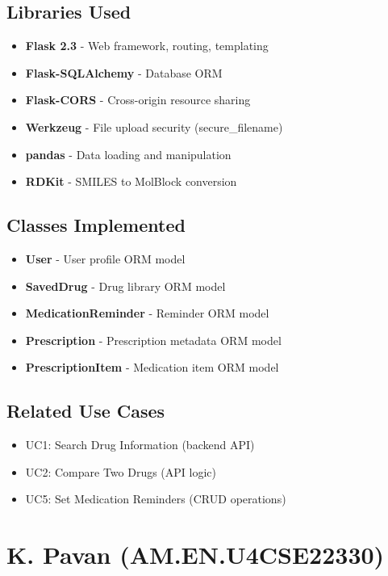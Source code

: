 \documentclass[12pt,a4paper]{report}
\begin{document}
\section{Libraries Used}
\begin{itemize}
    \item \textbf{Flask 2.3} - Web framework, routing, templating
    \item \textbf{Flask-SQLAlchemy} - Database ORM
    \item \textbf{Flask-CORS} - Cross-origin resource sharing
    \item \textbf{Werkzeug} - File upload security (secure\_filename)
    \item \textbf{pandas} - Data loading and manipulation
    \item \textbf{RDKit} - SMILES to MolBlock conversion
\end{itemize}

\section{Classes Implemented}
\begin{itemize}
    \item \textbf{User} - User profile ORM model
    \item \textbf{SavedDrug} - Drug library ORM model
    \item \textbf{MedicationReminder} - Reminder ORM model
    \item \textbf{Prescription} - Prescription metadata ORM model
    \item \textbf{PrescriptionItem} - Medication item ORM model
\end{itemize}

\section{Related Use Cases}
\begin{itemize}
    \item UC1: Search Drug Information (backend API)
    \item UC2: Compare Two Drugs (API logic)
    \item UC5: Set Medication Reminders (CRUD operations)
\end{itemize}

\newpage

\chapter{K. Pavan (AM.EN.U4CSE22330)}
\end{document}
